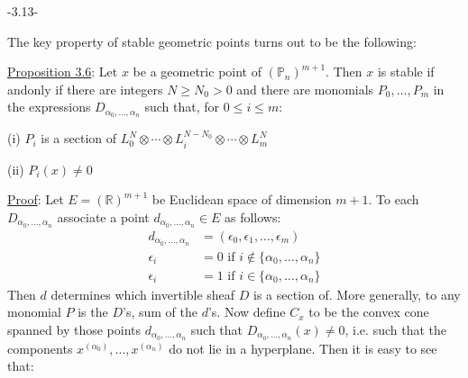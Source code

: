 \begin{center}-3.13-\end{center}
The key property of stable geometric points turns out to be the following:

\uline{Proposition 3.6}: Let $x$ be a geometric point of $(\mathbb{P}_n)^{m+1}$. Then $x$ is stable if andonly if there are integers $N\geq N_0>0$ and there are monomials $P_0,\ldots,P_m$ in the expressions $D_{\alpha_0,\ldots,\alpha_n}$ such that, for $0\leq i\leq m$:

(i) $P_i$ is a section of $L_0^N\otimes\cdots\otimes L_i^{N-N_0}\otimes\cdots\otimes L_m^N$

(ii) $P_i(x)\ne0$

\uline{Proof}: Let $E=(\mathbb{R})^{m+1}$ be Euclidean space of dimension $m+1$. To each $D_{\alpha_0,\ldots,\alpha_n}$ associate a point $d_{\alpha_0,\ldots,\alpha_n}\in E$ as follows:
\[
\begin{aligned}
d_{\alpha_0,\ldots,\alpha_n}&=(\epsilon_0,\epsilon_1,\ldots,\epsilon_m)\\
\epsilon_i&=0\text{ if }i\notin\{\alpha_0,\ldots,\alpha_n\}\\
\epsilon_i&=1\text{ if }i\in\{\alpha_0,\ldots,\alpha_n\}
\end{aligned}
\]
Then $d$ determines which invertible sheaf $D$ is a section of. More generally, to any monomial $P$ is the $D$'s,  sum of the $d$'s. Now define $C_x$ to be the convex cone spanned by those points $d_{\alpha_0,\ldots,\alpha_n}$ such that $D_{\alpha_0,\ldots,\alpha_n}(x)\ne0$, i.e. such that the components $x^{(\alpha_0)},\ldots,x^{(\alpha_n)}$ do not lie in a hyperplane. Then it is easy to see that:
